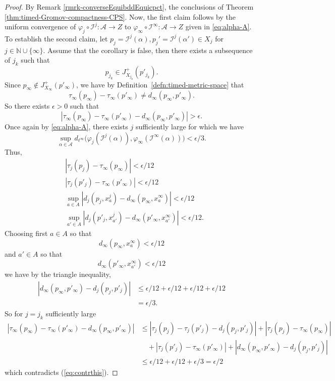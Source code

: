 \documentclass[a4paper,12pt,reqno]{amsart}
\theoremstyle{plain}
\newcommand{\be}{\begin{equation}}
\newcommand{\ee}{\end{equation}}
\begin{document}
\begin{proof}
By Remark \ref{rmrk-converseEquibddEquicpct}, 
the conclusions of Theorem \ref{thm:timed-Gromov-compactness-CPS}. Now, the first claim follows by the uniform convergence of 
$\varphi_j \circ \mathcal I^j: \mathcal A \to Z$ to $\varphi_\infty \circ \mathcal I^\infty: \mathcal A \to Z$ given in \eqref{eq:alpha-A}. To establish the second claim, let $p_j=\mathcal{I}^j(\alpha),p_j'=\mathcal{I}^j(\alpha')\in X_j$ for $j \in \mathbb N \cup \{\infty\}$. 
Assume that the corollary is false, 
then there exists a subsequence of $j_k$ such that 
\be
p_{j_k}\in J^+_{X_{j_k}}(p'_{j_k}).
\ee
Since $p_\infty\notin J^+_{X_\infty}(p'_\infty)
$, we have by Definition~\ref{defn:timed-metric-space} that
\be
\tau_\infty(p_\infty)-
\tau_\infty(p'_\infty)\neq
d_\infty(p_\infty,p'_\infty).
\ee
So there exists $\epsilon>0$ such that
\be\label{eq:contrthis}
|\tau_\infty(p_\infty)-
\tau_\infty(p'_\infty)-
d_\infty(p_\infty,p'_\infty)|
>\epsilon.
\ee
Once again by \eqref{eq:alpha-A}, there exists
$j$ sufficiently large for which we have
\be \label{eq:alpha-A-used}
\sup_{\alpha \in \mathcal{A}}
d_{\ell^\infty}\Big(\varphi_{j}({\mathcal I}^{j}(\alpha)),\varphi_\infty({\mathcal I}^\infty(\alpha))\Big) <\epsilon/3.
\ee
Thus, 
\begin{eqnarray}
&|\tau_j(p_j)-\tau_\infty(p_\infty)| <
\epsilon/12\\
&|\tau_j(p'_j)-\tau_\infty(p'_\infty)| < \epsilon/12\\
&\sup_{a\in A} |d_j(p_j,x^j_a)-d_\infty(p_\infty,x^\infty_a) | < \epsilon/12\\
 &\sup_{a'\in A}|d_j(p'_j,x^j_{a'})-d_\infty(p'_\infty,x^\infty_{a'})|<\epsilon/12.
\end{eqnarray}
Choosing first $a\in A$ 
so that
\be
d_\infty(p_\infty,x^\infty_{a})<\epsilon/12
\ee
and
$a'\in  A$ so that
\be
d_\infty(p'_\infty,x^\infty_{a'})<\epsilon/12
\ee
we have by the triangle inequality,
\begin{align}
|d_\infty(p_\infty,p'_\infty)
-d_j(p_j,p'_j)| &\leq 
\epsilon/12+\epsilon/12+\epsilon/12+\epsilon/12 \\
 &=  \epsilon/3.
\end{align}
So for $j=j_k$ sufficiently large 
\begin{align}
|\tau_\infty(p_\infty)-
\tau_\infty(p'_\infty)-
d_\infty(p_\infty,p'_\infty)|
&\leq 
|\tau_j(p_j)-
\tau_j(p'_j)-
d_j(p_j,p'_j)|
 + 
|\tau_j(p_j)-\tau_\infty(p_\infty)| \nonumber\\
&\quad + |\tau_j(p'_j)-\tau_\infty(p'_\infty)|
+ |d_\infty(p_\infty,p'_\infty)
-d_j(p_j,p'_j)| \\
 &\leq \epsilon/12+\epsilon/12+\epsilon/3=\epsilon/2
 \end{align}
 which contradicts
 (\ref{eq:contrthis}).
\end{proof}
\end{document}
